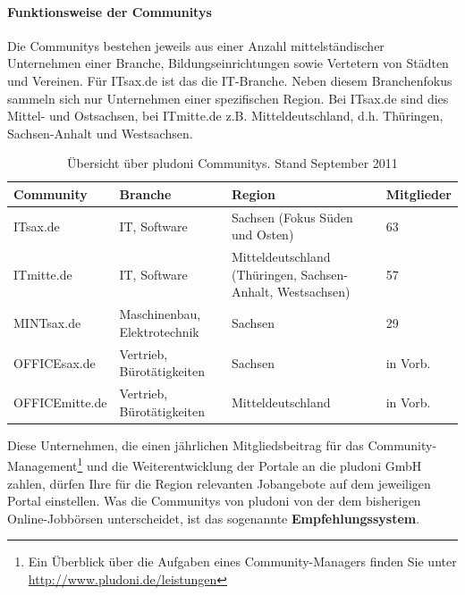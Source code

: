 \paragraph{Funktionsweise der Communitys}
Die Communitys bestehen jeweils aus einer Anzahl mittelständischer Unternehmen einer Branche, Bildungseinrichtungen sowie Vertetern von Städten und Vereinen. Für ITsax.de ist das die IT-Branche. Neben diesem Branchenfokus sammeln sich nur Unternehmen einer spezifischen Region. Bei ITsax.de sind dies Mittel- und Ostsachsen, bei ITmitte.de z.B. Mitteldeutschland, d.h. Thüringen, Sachsen-Anhalt und Westsachsen.
\begin{table}[htbp]
\label{tb:dt}
\caption{Übersicht über pludoni Communitys. Stand September 2011}
\begin{tabular}{|l|p{3.8cm}|p{5cm}|l|}
\hline
\rowcolor{Gray}
Community & Branche & Region & Mitglieder \\\hline
ITsax.de & IT, Software &  Sachsen (Fokus Süden und Osten) & 63\\\hline
ITmitte.de & IT, Software &  Mitteldeutschland (Thüringen, Sachsen-Anhalt, Westsachsen) & 57 \\\hline
MINTsax.de & Maschinenbau, Elektrotechnik &  Sachsen & 29\\\hline
OFFICEsax.de & Vertrieb, Bürotätigkeiten &  Sachsen & in Vorb.\\\hline
OFFICEmitte.de & Vertrieb, Bürotätigkeiten &  Mitteldeutschland & in Vorb.\\\hline
\end{tabular}
\end{table}



Diese Unternehmen, die einen jährlichen Mitgliedsbeitrag für das Community\hyp{}Management\footnote{Ein Überblick über die Aufgaben eines Community-Managers finden Sie unter \url{http://www.pludoni.de/leistungen}} und die Weiterentwicklung der Portale an die pludoni GmbH zahlen, dürfen Ihre für die Region relevanten Jobangebote auf dem jeweiligen Portal einstellen. Was die Communitys von pludoni von der dem bisherigen Online-Jobbörsen unterscheidet, ist das sogenannte \textbf{Empfehlungssystem}.

